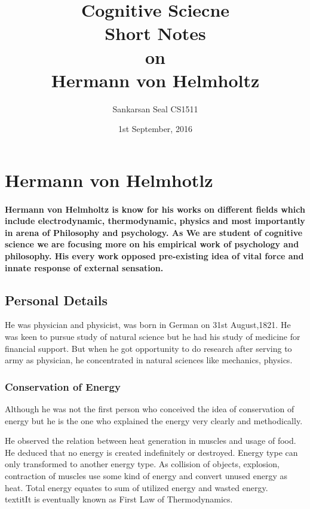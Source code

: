 \documentclass[11pt]{article}
\begin{document}
\title{Cognitive Sciecne\\ Short Notes\\ on\\ Hermann von Helmholtz}
\author{Sankarsan Seal CS1511}
\date{1st September, 2016}
\maketitle

\section{Hermann von Helmhotlz}
\paragraph{Hermann von Helmholtz is know for his works on different fields which include electrodynamic, thermodynamic, physics and most importantly in arena of Philosophy and psychology. As We are student of cognitive science we are focusing more on his empirical work of psychology and philosophy. His every work opposed pre-existing idea of vital force and innate response of external sensation.}

\subsection{Personal Details}
He was physician and physicist, was born in German on 31st August,1821. He was keen to pursue study of natural science but he had his study of medicine for financial support. But when he got opportunity to do research after serving to army as physician, he concentrated in natural sciences like mechanics, physics.

\subsubsection{Conservation of Energy}
Although he was not the first person who conceived the idea of conservation of energy but he is the one who explained the energy very clearly and methodically.

He observed the relation between heat generation in muscles and  usage of food. He deduced that no energy is created indefinitely or destroyed. Energy type can only transformed to another energy type. As collision of objects, explosion, contraction of muscles use some kind of energy and convert unused energy as heat. Total energy equates to  sum of utilized energy and wasted energy. \\textit{It is eventually known as First Law of Thermodynamics.}
\end{document}
